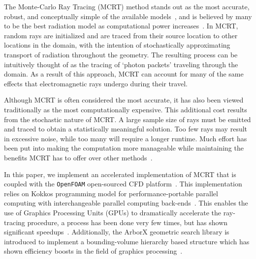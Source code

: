 The Monte-Carlo Ray Tracing (MCRT) method stands out as the most accurate, robust, and conceptually simple of the available models~\cite{Tesse2002RadiativeApproach,Modest2013RadiativeTransfer,Coelho2018RadiativeSystems}, and is believed by many to be the best radiation model as computational power increases~\cite{Howell2010ThermalTransfer}.
In MCRT, random rays are initialized and are traced from their source location to other locations in the domain, with the intention of stochastically approximating transport of radiation throughout the geometry.
The resulting process can be intuitively thought of as the tracing of `photon packets' traveling through the domain.
As a result of this approach, MCRT can account for many of the same effects that electromagnetic rays undergo during their travel.

Although MCRT is often considered the most accurate, it has also been viewed traditionally as the most computationally expensive.
This additional cost results from the stochastic nature of MCRT. A large sample size of rays must be emitted and traced to obtain a statistically meaningful solution. 
Too few rays may result in excessive noise, while too many will require a longer runtime.
Much effort has been put into making the computation more manageable while maintaining the benefits MCRT has to offer over other methods~\cite{Liu2020TheFlames,Tesse2002RadiativeApproach,Zeeb2001AnGeometries,Modest2003BackwardTransfer,Howell2010ThermalTransfer}.

In this paper, we implement an accelerated implementation of MCRT that is coupled with the \verb|OpenFOAM| open-sourced CFD platform~\cite{Weller1998ATechniques}. 
This implementation relies on Kokkos programming model for performance-portable parallel computing with interchangeable parallel computing back-ends~\cite{Trott2021KokkosEra}. This enables the use of Graphics Processing Units (GPUs) to dramatically accelerate the ray-tracing procedure, a process has been done very few times, but has shown significant speedups~\cite{Silvestri2019ASimulation,Humphrey2016RadiativeRefinement,Heymann2012GPU-basedAGN}. 
Additionally, the ArborX geometric search library is introduced to implement a bounding-volume hierarchy based structure which has shown efficiency boosts in the field of graphics processing~\cite{Lebrun-Grandie2019ArborX:Library}. 

